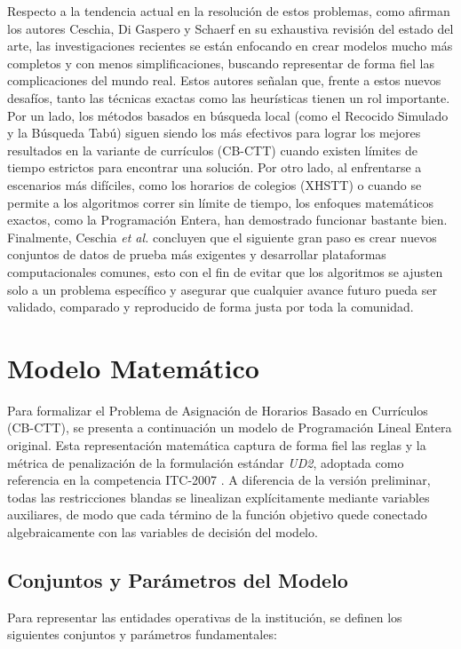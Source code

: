 \documentclass[letter, 10pt]{article}
\begin{document}
Respecto a la tendencia actual en la resolución de estos problemas, como afirman los autores Ceschia, Di Gaspero y Schaerf \cite{ceschia2023} en su exhaustiva revisión del estado del arte, las investigaciones recientes se están enfocando en crear modelos mucho más completos y con menos simplificaciones, buscando representar de forma fiel las complicaciones del mundo real. Estos autores señalan que, frente a estos nuevos desafíos, tanto las técnicas exactas como las heurísticas tienen un rol importante. Por un lado, los métodos basados en búsqueda local (como el Recocido Simulado y la Búsqueda Tabú) siguen siendo los más efectivos para lograr los mejores resultados en la variante de currículos (CB-CTT) cuando existen límites de tiempo estrictos para encontrar una solución. Por otro lado, al enfrentarse a escenarios más difíciles, como los horarios de colegios (XHSTT) o cuando se permite a los algoritmos correr sin límite de tiempo, los enfoques matemáticos exactos, como la Programación Entera, han demostrado funcionar bastante bien. Finalmente, Ceschia \textit{et al.} \cite{ceschia2023} concluyen que el siguiente gran paso es crear nuevos conjuntos de datos de prueba más exigentes y desarrollar plataformas computacionales comunes, esto con el fin de evitar que los algoritmos se ajusten solo a un problema específico y asegurar que cualquier avance futuro pueda ser validado, comparado y reproducido de forma justa por toda la comunidad.

\section{Modelo Matem\'atico}

Para formalizar el Problema de Asignación de Horarios Basado en Currículos (CB-CTT), se presenta a continuación un modelo de Programación Lineal Entera original. Esta representación matemática captura de forma fiel las reglas y la métrica de penalización de la formulación estándar \textit{UD2}, adoptada como referencia en la competencia ITC-2007 \cite{digaspero2007, decesco2008, lach2012}. A diferencia de la versión preliminar, todas las restricciones blandas se linealizan explícitamente mediante variables auxiliares, de modo que cada término de la función objetivo quede conectado algebraicamente con las variables de decisión del modelo.

\subsection{Conjuntos y Parámetros del Modelo}
Para representar las entidades operativas de la institución, se definen los siguientes conjuntos y parámetros fundamentales:
\end{document}
